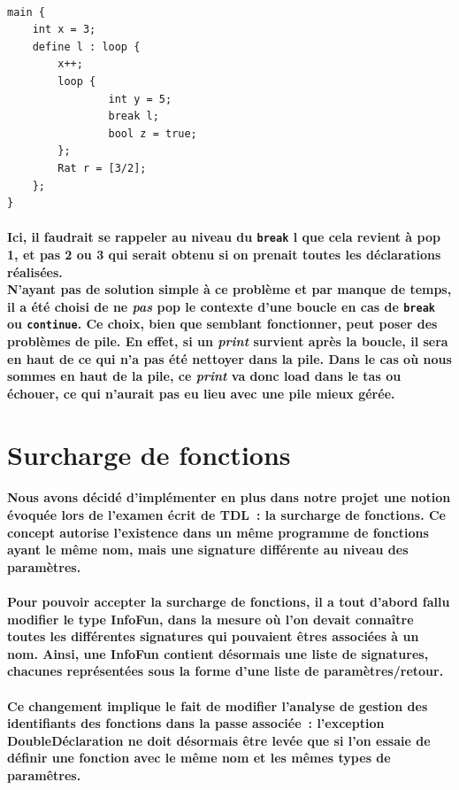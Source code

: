 \documentclass[french]{article}
\begin{document}
\, %
\begin{lstlisting}[language=ratcode]
main {
    int x = 3;
    define l : loop {
        x++;
        loop {
                int y = 5;
                break l;
                bool z = true;
        };
        Rat r = [3/2];
    };
}
\end{lstlisting}
\paragraph*{Ici, il faudrait se rappeler au niveau du \texttt{break} l que cela revient à pop 1, et pas 2 ou 3 qui serait obtenu si on prenait toutes les déclarations réalisées.\\
N'ayant pas de solution simple à ce problème et par manque de temps, il a été choisi de ne \emph{pas} pop le contexte d'une boucle en cas de \texttt{break} ou \texttt{continue}.
Ce choix, bien que semblant fonctionner, peut poser des problèmes de pile. En effet, si un \emph{print} survient après la boucle, il sera en haut de ce qui n'a pas été nettoyer dans la pile.
Dans le cas où nous sommes en haut de la pile, ce \emph{print} va donc load dans le tas ou échouer, ce qui n'aurait pas eu lieu avec une pile mieux gérée.}

\section{Surcharge de fonctions}
\paragraph{Nous avons décidé d'implémenter en plus dans notre projet une notion évoquée lors de l'examen écrit de TDL~: la surcharge de fonctions.
Ce concept autorise l'existence dans un même programme de fonctions ayant le même nom, mais une signature différente au niveau des paramètres.}
\paragraph{Pour pouvoir accepter la surcharge de fonctions, il a tout d'abord fallu modifier le type InfoFun, dans la mesure où l'on devait connaître 
toutes les différentes signatures qui pouvaient êtres associées à un nom. Ainsi, une InfoFun contient désormais une liste de signatures, chacunes représentées sous
la forme d'une liste de paramètres/retour.}
\paragraph{Ce changement implique le fait de modifier l'analyse de gestion des identifiants des fonctions dans la passe associée~: l'exception DoubleDéclaration
ne doit désormais être levée que si l'on essaie de définir une fonction avec le même nom et les mêmes types de paramêtres.}
\end{document}
